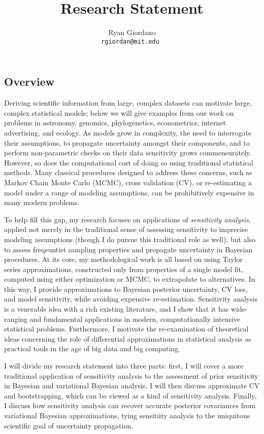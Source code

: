 

\title{Research Statement}

\author{
  Ryan Giordano \\ \texttt{rgiordan@mit.edu }
}




\subsection*{Overview}

Deriving scientific information from large, complex datasets can motivate large,
complex statistical models; below we will give examples from our work on
problems in astronomy, genomics, phylogenetics, econometrics, internet
advertising, and ecology.  As models grow in complexity, the need to interrogate
their assumptions, to propagate uncertainty amongst their components, and to
perform non-parametric checks on their data sensitivity grows commensurately.
However, so does the computational cost of doing so using traditional
statistical methods. Many classical procedures designed to address these
concerns, such as Markov Chain Monte Carlo (MCMC), cross validation (CV), or
re-estimating a model under a range of modeling assumptions, can be
prohibitively expensive in many modern problems.

To help fill this gap, my research focuses on applications of {\em sensitivity
analysis}, applied not merely in the traditional sense of assessing sensitivity
to imprecise modeling assumptions (though I do pursue this traditional role as
well), but also to assess freqeuntist sampling properties and propagate
uncertainty in Bayesian procedures.  At its core, my methodological work is all
based on using Taylor series approximations, constructed only from properties of
a single model fit, computed using either optimization or MCMC, to extrapolate
to alternatives.  In this way, I provide approximations to Bayesian posterior
uncertainty, CV loss, and model sensitivity, while avoiding expensive
re-estimation.  Sensitivity analysis is a venerable idea with a rich existing
literature, and I show that it has wide-ranging and fundamental applications in
modern, computationally intensive statistical problems.  Furthermore, I motivate
the re-examination of theoretical ideas concerning the role of differential
approximations in statistical analysis as practical tools in the age of big data
and big computing.

I will divide my research statement into three parts: first, I will cover a more
traditional application of sensitivity analysis to the assessment of prior
sensitivity in Bayesian and variational Bayesian analysis.  I will then discuss
approximate CV and bootstrapping, which can be viewed as a kind of sensitivity
analysis.  Finally, I discuss how sensitivity analysis can recover accurate
posterior covariances from variational Bayesian approximations, tying sensitiity
analysis to the uniquitous scientific goal of uncertainty propagation.


